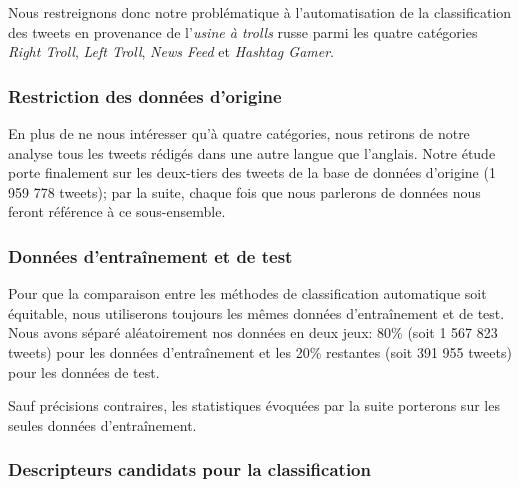 \documentclass[twocolumn,10pt]{article}
\begin{document}
Nous restreignons donc notre problématique à l'automatisation de la classification des tweets en provenance de l'\textit{usine à trolls} russe parmi les quatre catégories \textit{Right Troll}, \textit{Left Troll}, \textit{News Feed} et \textit{Hashtag Gamer}.

\subsubsection{Restriction des données d'origine}

En plus de ne nous intéresser qu'à quatre catégories, nous retirons de notre analyse tous les tweets rédigés dans une autre langue que l'anglais. Notre étude porte finalement sur les deux-tiers des tweets de la base de données d'origine (1 959 778 tweets); par la suite, chaque fois que nous parlerons de données nous feront référence à ce sous-ensemble.

\subsubsection{Données d'entraînement et de test}

Pour que la comparaison entre les méthodes de classification automatique soit équitable, nous utiliserons toujours les mêmes données d'entraînement et de test. Nous avons séparé aléatoirement nos données en deux jeux: 80\% (soit 1 567 823 tweets) pour les données d'entraînement et les 20\% restantes (soit 391 955 tweets) pour les données de test.

Sauf précisions contraires, les statistiques évoquées par la suite porterons sur les seules données d'entraînement.

\subsubsection{Descripteurs candidats pour la classification}
\end{document}
